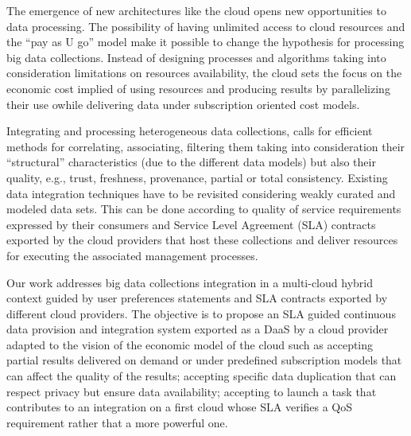 The emergence of new architectures like the cloud opens new opportunities to data processing. 
The possibility of having unlimited access to cloud resources and the ``pay as U go'' model make it possible to change the hypothesis for processing big  data collections. 
Instead of designing processes and algorithms taking into consideration  limitations on resources availability, the cloud sets the focus on the economic cost implied of using resources and producing results by parallelizing their use owhile delivering data under subscription oriented cost models.
 
Integrating and processing heterogeneous data collections, calls for efficient methods for correlating, associating, filtering them taking into consideration their ``structural'' characteristics (due to the different data models) but also their quality, e.g., trust, freshness, provenance, partial or total consistency. 
Existing data integration techniques have to be revisited considering weakly curated and modeled data sets. This can be done according to quality of service requirements expressed by their consumers and Service Level Agreement (SLA) contracts exported by the cloud providers that host  these collections and deliver resources for executing the associated management processes.


Our work addresses big data collections integration  in a multi-cloud hybrid context guided by user preferences statements and SLA contracts exported by different cloud providers. The objective is to propose an SLA guided continuous data provision and integration system exported as a DaaS by a cloud provider adapted to the vision of the economic model of the cloud such as accepting partial results delivered on demand or under predefined subscription models that can affect the quality of the results; accepting specific data duplication that can respect privacy but ensure data availability; accepting to launch a task that contributes to an integration on a first cloud whose SLA verifies a QoS requirement rather that a more powerful one.  

